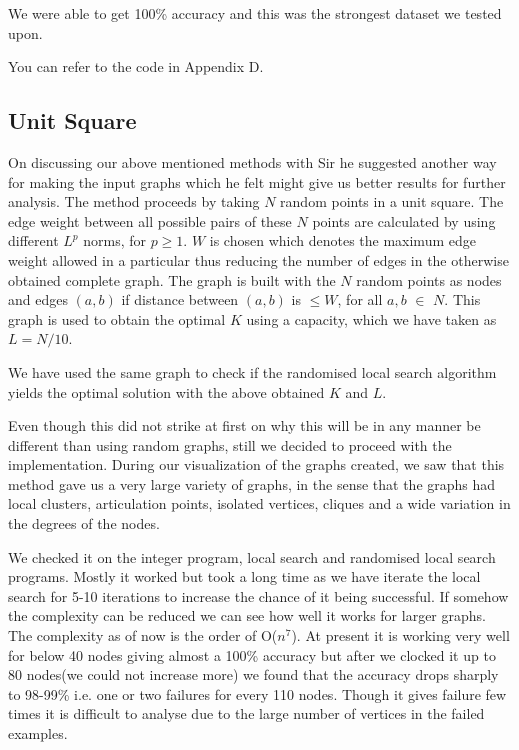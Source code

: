 \documentclass[12pt,a4paper,onecolumn]{article}
\begin{document}
We were able to get 100\% accuracy and this was the strongest dataset we tested upon.

You can refer to the code in Appendix D.

\subsection{Unit Square}
On discussing our above mentioned methods with Sir he suggested another way for making the input graphs which he felt might give us better  results for further analysis. 
The method proceeds by taking $N$ random points in a unit square.
The edge weight between all possible pairs of these $N$ points are calculated by using different $L^p$ norms, for $p \geq 1$.
$W$ is chosen which denotes the maximum edge weight allowed in a particular thus reducing the number of edges in the otherwise obtained complete graph. 
The graph is built with the $N$ random points as nodes and edges $(a,b)$ if distance between $(a,b)$ is $\leq W$, for all $a,b$ $\in$ $N$. 
This graph is used to obtain the optimal $K$ using a capacity, which we have taken as $L = N/10$.

We have used the same graph to check if the randomised local search algorithm yields the optimal solution with the above obtained $K$ and $L$.


Even though this did not strike at first on why this will be in any manner be different than using random graphs, still we decided to proceed with the implementation. During our visualization of the graphs created, we saw that this method gave us a very large variety of graphs, in the sense that the graphs had local clusters, articulation points, isolated vertices, cliques and a wide variation in the degrees of the nodes.

We checked it on the integer program, local search and randomised local search programs. Mostly it worked but took a long time as we have iterate the local search for 5-10 iterations to increase the chance of it being successful. If somehow the complexity can be reduced we can see how well it works for larger graphs. The complexity as of now is the order of O($n^7$). At present it is working very well for below 40 nodes giving almost a 100\% accuracy but after we clocked it up to 80 nodes(we could not increase more) we found that the accuracy drops sharply to 98-99\%  i.e. one or two failures for every 110 nodes. Though it gives failure few times it is difficult to analyse due to the large number of vertices in the failed examples. 
\end{document}

